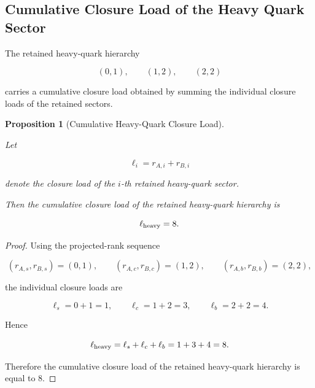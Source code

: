 \documentclass[11pt]{article}
\newtheorem{proposition}[theorem]{Proposition}
\theoremstyle{definition}
\theoremstyle{remark}
\begin{document}

\subsection{Cumulative Closure Load of the Heavy Quark Sector}
\label{subsec:cumulative_closure_load_heavy_quarks}

The retained heavy-quark hierarchy

\begin{equation}
(0,1),
\qquad
(1,2),
\qquad
(2,2)
\end{equation}

carries a cumulative closure load obtained by summing the
individual closure loads of the retained sectors.

\begin{proposition}[Cumulative Heavy-Quark Closure Load]
\label{prop:cumulative_heavy_quark_load}

Let

\begin{equation}
\ell_i
=
r_{A,i}+r_{B,i}
\end{equation}

denote the closure load of the \(i\)-th retained heavy-quark
sector.

Then the cumulative closure load of the retained heavy-quark
hierarchy is

\begin{equation}
\ell_{\rm heavy}
=
8.
\end{equation}

\end{proposition}

\begin{proof}

Using the projected-rank sequence

\begin{equation}
(r_{A,s},r_{B,s})=(0,1),
\qquad
(r_{A,c},r_{B,c})=(1,2),
\qquad
(r_{A,b},r_{B,b})=(2,2),
\end{equation}

the individual closure loads are

\begin{equation}
\ell_s=0+1=1,
\qquad
\ell_c=1+2=3,
\qquad
\ell_b=2+2=4.
\end{equation}

Hence

\begin{equation}
\ell_{\rm heavy}
=
\ell_s+\ell_c+\ell_b
=
1+3+4
=
8.
\end{equation}

Therefore the cumulative closure load of the retained
heavy-quark hierarchy is equal to \(8\).

\end{proof}
\end{document}
